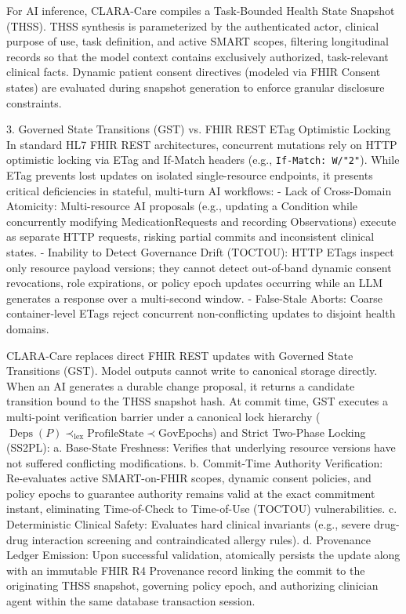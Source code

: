 \documentclass[10pt,letterpaper]{article}
\begin{document}
For AI inference, CLARA-Care compiles a Task-Bounded Health State Snapshot (THSS). THSS synthesis is parameterized by the authenticated actor, clinical purpose of use, task definition, and active SMART scopes, filtering longitudinal records so that the model context contains exclusively authorized, task-relevant clinical facts. Dynamic patient consent directives (modeled via FHIR Consent states) are evaluated during snapshot generation to enforce granular disclosure constraints.

3. Governed State Transitions (GST) vs. FHIR REST ETag Optimistic Locking
In standard HL7 FHIR REST architectures, concurrent mutations rely on HTTP optimistic locking via ETag and If-Match headers (e.g., \texttt{If-Match: W/"2"}). While ETag prevents lost updates on isolated single-resource endpoints, it presents critical deficiencies in stateful, multi-turn AI workflows:
- Lack of Cross-Domain Atomicity: Multi-resource AI proposals (e.g., updating a Condition while concurrently modifying MedicationRequests and recording Observations) execute as separate HTTP requests, risking partial commits and inconsistent clinical states.
- Inability to Detect Governance Drift (TOCTOU): HTTP ETags inspect only resource payload versions; they cannot detect out-of-band dynamic consent revocations, role expirations, or policy epoch updates occurring while an LLM generates a response over a multi-second window.
- False-Stale Aborts: Coarse container-level ETags reject concurrent non-conflicting updates to disjoint health domains.

CLARA-Care replaces direct FHIR REST updates with Governed State Transitions (GST). Model outputs cannot write to canonical storage directly. When an AI generates a durable change proposal, it returns a candidate transition bound to the THSS snapshot hash. At commit time, GST executes a multi-point verification barrier under a canonical lock hierarchy ($\operatorname{Deps}(P) \prec_{\text{lex}} \text{ProfileState} \prec \text{GovEpochs}$) and Strict Two-Phase Locking (SS2PL):
a. Base-State Freshness: Verifies that underlying resource versions have not suffered conflicting modifications.
b. Commit-Time Authority Verification: Re-evaluates active SMART-on-FHIR scopes, dynamic consent policies, and policy epochs to guarantee authority remains valid at the exact commitment instant, eliminating Time-of-Check to Time-of-Use (TOCTOU) vulnerabilities.
c. Deterministic Clinical Safety: Evaluates hard clinical invariants (e.g., severe drug-drug interaction screening and contraindicated allergy rules).
d. Provenance Ledger Emission: Upon successful validation, atomically persists the update along with an immutable FHIR R4 Provenance record linking the commit to the originating THSS snapshot, governing policy epoch, and authorizing clinician agent within the same database transaction session.
\end{document}
